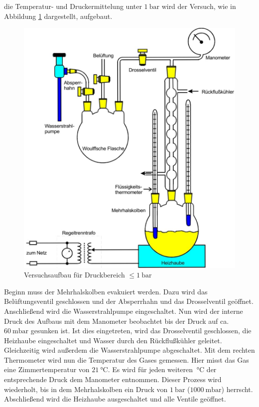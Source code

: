 \justifying die Temperatur- und Druckermittelung unter $\SI{1}{\bar}$ wird der Versuch, wie in Abbildung \ref{fig:1} dargestellt,
aufgebaut.

\begin{figure}
    \centering
    \includegraphics[width=0.75\linewidth]{./images/k1bar.jpg}
    \caption{Versuchsaufbau für Druckbereich $\leq \SI{1}{\bar}$ \cite{V203}}
    \label{fig:1}
\end{figure}
\newpage

\justifying Beginn muss der Mehrhalskolben evakuiert werden. Dazu wird das Belüftungsventil geschlossen und der Absperrhahn und
das Drosselventil geöffnet. Anschließend wird die Wasserstrahlpumpe eingeschaltet. Nun wird der interne Druck des Aufbaus mit dem Manometer
beobachtet bis der Druck auf ca. $\SI{60}{\milli\bar}$ gesunken ist. Ist dies eingetreten, wird das Drosselventil geschlossen, die Heizhaube
eingeschaltet und Wasser durch den Rückflußkühler geleitet. Gleichzeitig wird außerdem die Wasserstrahlpumpe abgeschaltet. Mit dem rechten
Thermometer wird nun die Temperatur des Gases gemessen. Hier misst das Gas eine Zimmertemperatur von $\SI{21}{\celsius}$. Es wird für jeden 
weiteren $\SI{}{\celsius}$ der entsprechende Druck dem Manometer entnommen. Dieser Prozess wird wiederholt, bis in dem Mehrhalskolben ein Druck 
von $\SI{1}{\bar}$ ($\SI{1000}{\milli\bar}$) herrscht. Abschließend wird die Heizhaube ausgeschaltet und alle Ventile geöffnet.  


